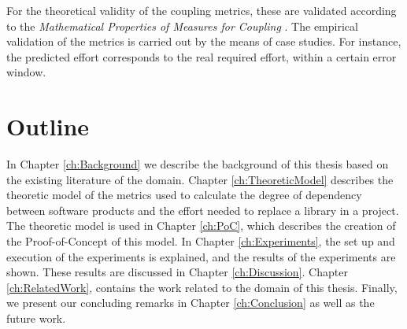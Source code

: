 For the theoretical validity of the coupling metrics, these are validated according to the \textit{Mathematical Properties of Measures for Coupling} \cite{srinivasan2014software}.
The empirical validation of the metrics is carried out by the means of case studies. For instance, the predicted effort corresponds to the real required effort, within a certain error window. 

\section{Outline}
In Chapter \ref{ch:Background} we describe the background of this thesis based on the existing literature of the domain.
Chapter \ref{ch:TheoreticModel} describes the theoretic model of the metrics used to calculate the degree of dependency between software products and the effort needed to replace a library in a project.
The theoretic model is used in Chapter \ref{ch:PoC}, which describes the creation of the Proof-of-Concept of this model.
In Chapter \ref{ch:Experiments}, the set up and execution of the experiments is explained, and the results of the experiments are shown. These results are discussed in Chapter \ref{ch:Discussion}. Chapter \ref{ch:RelatedWork}, contains the work related to the domain of this thesis.
Finally, we present our concluding remarks in Chapter \ref{ch:Conclusion} as well as the future work.
